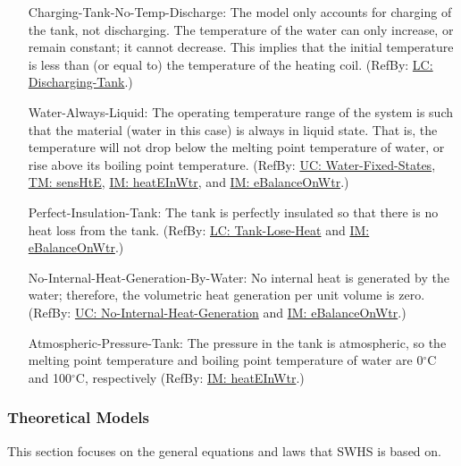 \documentclass[12pt]{article}
\begin{document}
\begin{itemize}
\item[Charging-Tank-No-Temp-Discharge:\phantomsection\label{assumpCTNTD}]The model only accounts for charging of the tank, not discharging. The temperature of the water can only increase, or remain constant; it cannot decrease. This implies that the initial temperature is less than (or equal to) the temperature of the heating coil. (RefBy: \hyperref[likeChgDT]{LC: Discharging-Tank}.)
\item[Water-Always-Liquid:\phantomsection\label{assumpWAL}]The operating temperature range of the system is such that the material (water in this case) is always in liquid state. That is, the temperature will not drop below the melting point temperature of water, or rise above its boiling point temperature. (RefBy: \hyperref[unlikeChgWFS]{UC: Water-Fixed-States}, \hyperref[TM:sensHtE]{TM: sensHtE}, \hyperref[IM:heatEInWtr]{IM: heatEInWtr}, and \hyperref[IM:eBalanceOnWtr]{IM: eBalanceOnWtr}.)
\item[Perfect-Insulation-Tank:\phantomsection\label{assumpPIT}]The tank is perfectly insulated so that there is no heat loss from the tank. (RefBy: \hyperref[likeChgTLH]{LC: Tank-Lose-Heat} and \hyperref[IM:eBalanceOnWtr]{IM: eBalanceOnWtr}.)
\item[No-Internal-Heat-Generation-By-Water:\phantomsection\label{assumpNIHGBW}]No internal heat is generated by the water; therefore, the volumetric heat generation per unit volume is zero. (RefBy: \hyperref[unlikeChgNIHG]{UC: No-Internal-Heat-Generation} and \hyperref[IM:eBalanceOnWtr]{IM: eBalanceOnWtr}.)
\item[Atmospheric-Pressure-Tank:\phantomsection\label{assumpAPT}]The pressure in the tank is atmospheric, so the melting point temperature and boiling point temperature of water are 0${}^{\circ}$C and 100${}^{\circ}$C, respectively (RefBy: \hyperref[IM:heatEInWtr]{IM: heatEInWtr}.)
\end{itemize}
\subsubsection{Theoretical Models}
\label{Sec:TMs}
This section focuses on the general equations and laws that SWHS is based on.
\par~
\end{document}
